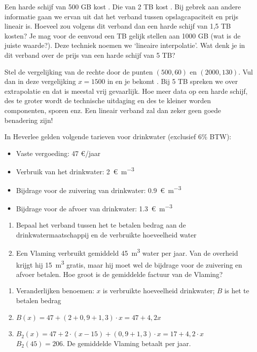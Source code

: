 \begin{oef}
Een harde schijf van 500 GB kost . Die van 2 TB kost . Bij gebrek aan andere informatie gaan we ervan uit dat het verband tussen opslagcapaciteit en prijs lineair is. Hoeveel zou volgens dit verband dan een harde schijf van 1,5 TB kosten? Je mag voor de eenvoud een TB gelijk stellen aan 1000 GB (wat is de juiste waarde?). Deze techniek noemen we `lineaire interpolatie'. Wat denk je in dit verband over de prijs van een harde schijf van 5 TB?
\begin{opl}
Stel de vergelijking van de rechte door de punten $(500,60)$ en $(2000,130)$. Vul dan in deze vergelijking $x=1500$ in en je bekomt . Bij 5 TB spreken we over extrapolatie en dat is meestal vrij gevaarlijk. Hoe meer data op een harde schijf, des te groter wordt de technische uitdaging en des te kleiner worden componenten, sporen enz. Een lineair verband zal dan zeker geen goede benadering zijn!
\end{opl}
\end{oef}

\begin{oef}
In Heverlee gelden volgende tarieven voor drinkwater (exclusief 6\% BTW):
\begin{itemize}
\item Vaste vergoeding: 47 \euro/jaar 
\item Verbruik van het drinkwater:  \SI{2}{\euro\per\cubic\metre} 
\item Bijdrage voor de zuivering van drinkwater: \SI{0,9}{\euro\per\cubic\metre}  
\item Bijdrage voor de afvoer van drinkwater: \SI{1,3}{\euro\per\cubic\metre}  
\end{itemize}
\begin{enumerate}
\item Bepaal het verband tussen het te betalen bedrag aan de drinkwatermaatschappij en de verbruikte hoeveelheid water
\item Een Vlaming verbruikt gemiddeld \SI{45}{\cubic\metre}   water per jaar. Van de overheid krijgt hij \SI{15}{\cubic\metre} gratis, maar hij moet wel de bijdrage voor de zuivering en afvoer betalen. Hoe groot is de gemiddelde factuur van de Vlaming?
\end{enumerate}

\begin{opl}
\begin{enumerate}
\item Veranderlijken benoemen: $x$ is verbruikte hoeveelheid drinkwater; $B$ is het te betalen bedrag
\item $B(x)=47+(2+0,9+1,3)\cdot x=47+4,2x$
\item $B_2(x)=47+2\cdot (x-15)+(0,9+1,3)\cdot x=17+4,2\cdot x$ \\
$B_2(45)=206$. De gemiddelde Vlaming betaalt  per jaar.
\end{enumerate}
\end{opl}
\end{oef}


